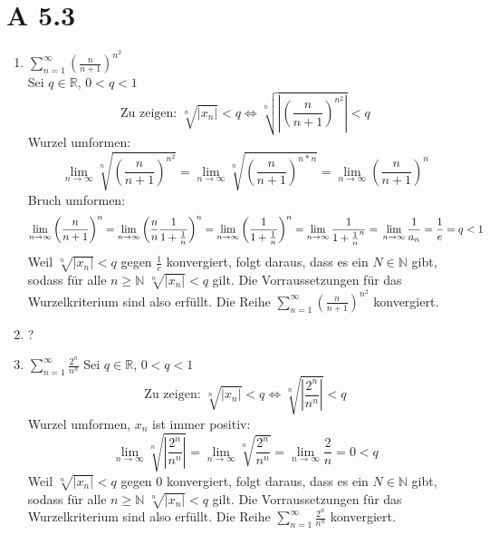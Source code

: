 \documentclass{article}
\begin{document}
    \section*{A 5.3}
    \begin{enumerate}[ label= (\roman*) ]
        \item \( \sum_{n=1}^{\infty} {\left( \frac{n}{n+1} \right)}^{n^2} \) \\
        Sei \(q \in \mathbb{R}\), \(0 < q < 1\) \\
        \[ \text{Zu zeigen: } \sqrt[n]{|x_n|} < q \Leftrightarrow \sqrt[n]{ \left| {\left( \frac{n}{n+1} \right)}^{n^2} \right| } < q \]
        Wurzel umformen:
        \[ 
            \lim_{n \to \infty} \sqrt[n]{ {\left( \frac{n}{n+1} \right)}^{n^2} } =
            \lim_{n \to \infty} \sqrt[n]{ {\left( \frac{n}{n+1} \right)}^{n * n} } = 
            \lim_{n \to \infty} {\left( \frac{n}{n+1} \right)}^{n}
        \]
        Bruch umformen:
        \[
            \lim_{n \to \infty} {\left( \frac{n}{n+1} \right)}^{n} =
            \lim_{n \to \infty} {\left( \frac{n}{n} \frac{1}{1+ \frac{1}{n}} \right)}^{n} =
            \lim_{n \to \infty} {\left( \frac{1}{1+ \frac{1}{n}} \right)}^{n} = 
            \lim_{n \to \infty} \frac{1}{ { 1 + \frac{1}{n} }^{n} } = \\
            \lim_{n \to \infty} \frac{1}{ a_n } =
            \frac{1}{e} = q < 1
        \]
        Weil \(\sqrt[n]{|x_n|} < q\) gegen \(\frac{1}{e}\) konvergiert,
        folgt daraus, dass es ein \(N \in \mathbb{N}\) gibt, sodass für alle \(n \geq \mathbb{N} \) \(\sqrt[n]{|x_n|} < q\) gilt.
        Die Vorraussetzungen für das Wurzelkriterium sind also erfüllt.
        Die Reihe \( \sum_{n=1}^{\infty} {\left( \frac{n}{n+1} \right)}^{n^2} \) konvergiert.

        \item ?

        \item \(\sum_{n=1}^{\infty} \frac{2^n}{n^n}\)
        Sei \(q \in \mathbb{R}\), \(0 < q < 1\) \\
        \[ \text{Zu zeigen: } \sqrt[n]{|x_n|} < q \Leftrightarrow \sqrt[n]{ \left| \frac{2^n}{n^n} \right| } < q \]
        Wurzel umformen, \(x_n\) ist immer positiv:
        \[
            \lim_{n \to \infty} \sqrt[n]{ \left| \frac{2^n}{n^n} \right| } 
            = \lim_{n \to \infty} \sqrt[n]{ \frac{2^n}{n^n} } 
            = \lim_{n \to \infty} \frac{2}{n} = 0 < q
        \]
        Weil \(\sqrt[n]{|x_n|} < q\) gegen \(0\) konvergiert,
        folgt daraus, dass es ein \(N \in \mathbb{N}\) gibt, sodass für alle \(n \geq \mathbb{N} \) \(\sqrt[n]{|x_n|} < q\) gilt.
        Die Vorraussetzungen für das Wurzelkriterium sind also erfüllt.
        Die Reihe \( \sum_{n=1}^{\infty} \frac{2^n}{n^n} \) konvergiert.


\end{enumerate}
\end{document}
